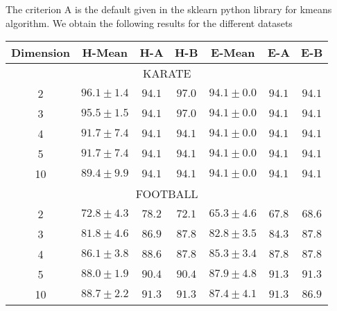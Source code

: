\documentclass{article}
\begin{document}
The criterion A is the default given in the sklearn python library for kmeans algorithm.  We obtain the following results for the different datasets
\begin{table} 
    \centering 
    \begin{tabular}{|c|ccc|ccc|}
      \hline Dimension & H-Mean & H-A & H-B &  E-Mean & E-A & E-B \\ \hline
      \hline
      \multicolumn{7}{|c|}{KARATE} \\
        \hline
        2& $96.1 \pm 1.4$ & $94.1$ & $97.0$& $94.1 \pm 0.0$&$94.1$ & $94.1$\\ \hline
        3& $95.5 \pm 1.5$ & $94.1$ & $97.0$& $94.1 \pm 0.0$&$94.1$ & $94.1$\\ \hline
        4& $91.7 \pm 7.4$ & $94.1$ & $94.1$& $94.1 \pm 0.0$&$94.1$ & $94.1$\\ \hline
        5& $91.7 \pm 7.4$ & $94.1$ & $94.1$& $94.1 \pm 0.0$&$94.1$ & $94.1$\\ \hline
        10& $89.4 \pm 9.9$ & $94.1$ & $94.1$& $94.1 \pm 0.0$&$94.1$ & $94.1$\\ \hline
      \hline
      \multicolumn{7}{|c|}{FOOTBALL} \\
      \hline
      2& $72.8 \pm 4.3$ & $78.2$ & $72.1$& $65.3 \pm 4.6$&$67.8$ & $68.6$\\ \hline
      3& $81.8 \pm 4.6$ & $86.9$ & $87.8$& $82.8 \pm 3.5$&$84.3$ & $87.8$\\ \hline
      4& $86.1 \pm 3.8$ & $88.6$ & $87.8$& $85.3 \pm 3.4$&$87.8$ & $87.8$\\ \hline
      5& $88.0 \pm 1.9$ & $90.4$ & $90.4$& $87.9 \pm 4.8$&$91.3$ & $91.3$\\ \hline
      10& $88.7 \pm 2.2$ & $91.3$ & $91.3$& $87.4 \pm 4.1$&$91.3$ & $86.9$\\ \hline
  \end{tabular}
\end{table}
\end{document}
